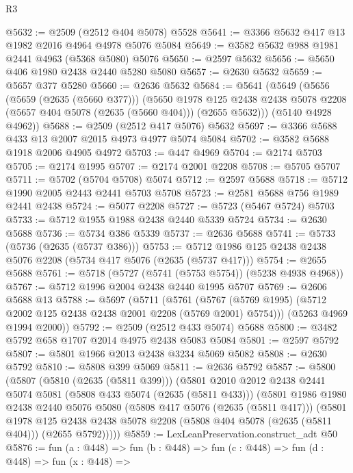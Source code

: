 \begin{lexlean}{R3}
\begin{coremodule}
@5632 := @2509 (@2512 @404 @5078) @5528
@5641 := @3366 @5632 @417 @13 @1982 @2016 @4964 @4978 @5076 @5084
@5649 := @3582 @5632 @988 @1981 @2441 @4963 (@5368 @5080) @5076
@5650 := @2597 @5632
@5656 := @5650 @406 @1980 @2438 @2440 @5280 @5080
@5657 := @2630 @5632
@5659 := @5657 @377 @5280
@5660 := @2636 @5632
@5684 := @5641
    (@5649
      (@5656
        (@5659 (@2635 (@5660 @377)))
        (@5650
          @1978
          @125
          @2438
          @2438
          @5078
          @2208
          (@5657 @404 @5078 (@2635 (@5660 @404)))
          (@2655 @5632)))
      (@5140 @4928 @4962))
@5688 := @2509 (@2512 @417 @5076) @5632
@5697 := @3366 @5688 @433 @13 @2007 @2015 @4973 @4977 @5074 @5084
@5702 := @3582 @5688 @1918 @2006 @4905 @4972
@5703 := @447 @4969
@5704 := @2174 @5703
@5705 := @2174 @1995
@5707 := @2174 @2001 @2208
@5708 := @5705 @5707
@5711 := @5702 (@5704 @5708) @5074
@5712 := @2597 @5688
@5718 := @5712 @1990 @2005 @2443 @2441 @5703 @5708
@5723 := @2581 @5688 @756 @1989 @2441 @2438
@5724 := @5077 @2208
@5727 := @5723 (@5467 @5724) @5703
@5733 := @5712 @1955 @1988 @2438 @2440 @5339 @5724
@5734 := @2630 @5688
@5736 := @5734 @386 @5339
@5737 := @2636 @5688
@5741 := @5733 (@5736 (@2635 (@5737 @386)))
@5753 := @5712 @1986 @125 @2438 @2438 @5076 @2208 (@5734 @417 @5076 (@2635 (@5737 @417)))
@5754 := @2655 @5688
@5761 := @5718 (@5727 (@5741 (@5753 @5754)) (@5238 @4938 @4968))
@5767 := @5712 @1996 @2004 @2438 @2440 @1995 @5707
@5769 := @2606 @5688 @13
@5788 := @5697
    (@5711
      (@5761 (@5767 (@5769 @1995) (@5712 @2002 @125 @2438 @2438 @2001 @2208 (@5769 @2001) @5754)))
      (@5263 @4969 @1994 @2000))
@5792 := @2509 (@2512 @433 @5074) @5688
@5800 := @3482 @5792 @658 @1707 @2014 @4975 @2438 @5083 @5084
@5801 := @2597 @5792
@5807 := @5801 @1966 @2013 @2438 @3234 @5069 @5082
@5808 := @2630 @5792
@5810 := @5808 @399 @5069
@5811 := @2636 @5792
@5857 := @5800
    (@5807
      (@5810 (@2635 (@5811 @399)))
      (@5801
        @2010
        @2012
        @2438
        @2441
        @5074
        @5081
        (@5808 @433 @5074 (@2635 (@5811 @433)))
        (@5801
          @1986
          @1980
          @2438
          @2440
          @5076
          @5080
          (@5808 @417 @5076 (@2635 (@5811 @417)))
          (@5801
            @1978
            @125
            @2438
            @2438
            @5078
            @2208
            (@5808 @404 @5078 (@2635 (@5811 @404)))
            (@2655 @5792)))))
@5859 := LexLeanPreservation.construct_adt @50
@5876 := fun (a : @448) =>
  fun (b : @448) =>
  fun (c : @448) =>
  fun (d : @448) =>
  fun (x : @448) =>

\end{coremodule}
\end{lexlean}
